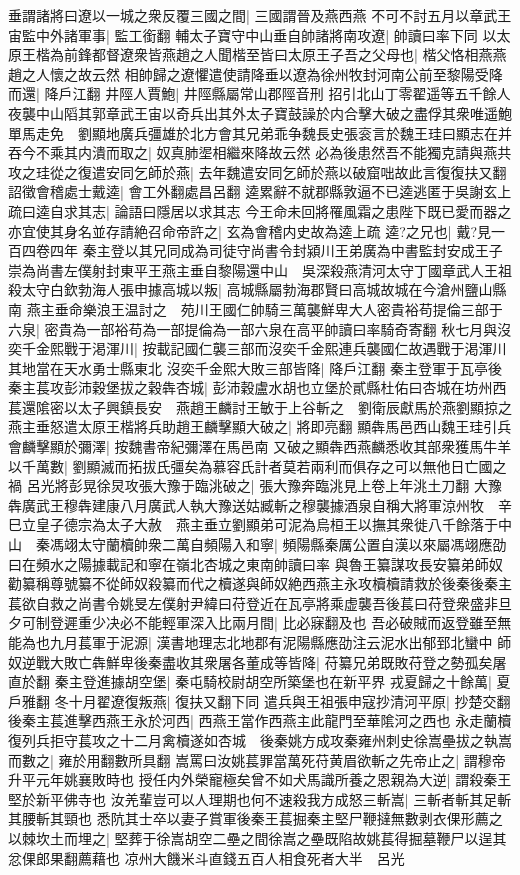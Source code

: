 垂謂諸將曰遼以一城之衆反覆三國之間|{
	三國謂晉及燕西燕}
不可不討五月以章武王宙監中外諸軍事|{
	監工銜翻}
輔太子寶守中山垂自帥諸將南攻遼|{
	帥讀曰率下同}
以太原王楷為前鋒都督遼衆皆燕趙之人聞楷至皆曰太原王子吾之父母也|{
	楷父恪相燕燕趙之人懷之故云然}
相帥歸之遼懼遣使請降垂以遼為徐州牧封河南公前至黎陽受降而還|{
	降戶江翻}
井陘人賈鮑|{
	井陘縣屬常山郡陘音刑}
招引北山丁零翟遥等五千餘人夜襲中山䧟其郭章武王宙以奇兵出其外太子寶鼓譟於内合擊大破之盡俘其衆唯遥鮑單馬走免　劉顯地廣兵彊雄於北方會其兄弟乖争魏長史張衮言於魏王珪曰顯志在并吞今不乘其内潰而取之|{
	奴真肺埿相繼來降故云然}
必為後患然吾不能獨克請與燕共攻之珪從之復遣安同乞師於燕|{
	去年魏遣安同乞師於燕以破窟咄故此言復復扶又翻}
詔徵會稽處士戴逵|{
	會工外翻處昌呂翻}
逵累辭不就郡縣敦逼不已逵逃匿于吳謝玄上疏曰逵自求其志|{
	論語曰隱居以求其志}
今王命未回將罹風霜之患陛下既已愛而器之亦宜使其身名並存請絶召命帝許之|{
	玄為會稽内史故為逵上疏}
逵?之兄也|{
	戴?見一百四卷四年}
秦主登以其兄同成為司徒守尚書令封潁川王弟廣為中書監封安成王子崇為尚書左僕射封東平王燕主垂自黎陽還中山　吳深殺燕清河太守丁國章武人王祖殺太守白欽勃海人張申據高城以叛|{
	高城縣屬勃海郡賢曰高城故城在今滄州鹽山縣南}
燕主垂命樂浪王温討之　苑川王國仁帥騎三萬襲鮮卑大人密貴裕苟提倫三部于六泉|{
	密貴為一部裕苟為一部提倫為一部六泉在高平帥讀曰率騎奇寄翻}
秋七月與沒奕千金熙戰于渇渾川|{
	按載記國仁襲三部而沒奕千金熙連兵襲國仁故遇戰于渇渾川其地當在天水勇士縣東北}
沒奕千金熙大敗三部皆降|{
	降戶江翻}
秦主登軍于瓦亭後秦主萇攻彭沛穀堡拔之穀犇杏城|{
	彭沛穀盧水胡也立堡於貳縣杜佑曰杏城在坊州西}
萇還隂密以太子興鎮長安　燕趙王麟討王敏于上谷斬之　劉衛辰獻馬於燕劉顯掠之燕主垂怒遣太原王楷將兵助趙王麟擊顯大破之|{
	將即亮翻}
顯犇馬邑西山魏王珪引兵會麟擊顯於彌澤|{
	按魏書帝紀彌澤在馬邑南}
又破之顯犇西燕麟悉收其部衆獲馬牛羊以千萬數|{
	劉顯滅而拓拔氏彊矣為慕容氏計者莫若兩利而俱存之可以無他日亡國之禍}
呂光將彭晃徐炅攻張大豫于臨洮破之|{
	張大豫奔臨洮見上卷上年洮土刀翻}
大豫犇廣武王穆犇建康八月廣武人執大豫送姑臧斬之穆襲據酒泉自稱大將軍涼州牧　辛巳立皇子德宗為太子大赦　燕主垂立劉顯弟可泥為烏桓王以撫其衆徙八千餘落于中山　秦馮翊太守蘭櫝帥衆二萬自頻陽入和寧|{
	頻陽縣秦厲公置自漢以來屬馮翊應劭曰在頻水之陽據載記和寧在嶺北杏城之東南帥讀曰率}
與魯王纂謀攻長安纂弟師奴勸纂稱尊號纂不從師奴殺纂而代之櫝遂與師奴絶西燕主永攻櫝櫝請救於後秦後秦主萇欲自救之尚書令姚旻左僕射尹緯曰苻登近在瓦亭將乘虚襲吾後萇曰苻登衆盛非旦夕可制登遲重少决必不能輕軍深入比兩月間|{
	比必寐翻及也}
吾必破賊而返登雖至無能為也九月萇軍于泥源|{
	漢書地理志北地郡有泥陽縣應劭注云泥水出郁郅北蠻中}
師奴逆戰大敗亡犇鮮卑後秦盡收其衆屠各董成等皆降|{
	苻纂兄弟既敗苻登之勢孤矣屠直於翻}
秦主登進據胡空堡|{
	秦屯騎校尉胡空所築堡也在新平界}
戎夏歸之十餘萬|{
	夏戶雅翻}
冬十月翟遼復叛燕|{
	復扶又翻下同}
遣兵與王祖張申寇抄清河平原|{
	抄楚交翻}
後秦主萇進擊西燕王永於河西|{
	西燕王當作西燕主此龍門至華隂河之西也}
永走蘭櫝復列兵拒守萇攻之十二月禽櫝遂如杏城　後秦姚方成攻秦雍州刺史徐嵩壘拔之執嵩而數之|{
	雍於用翻數所具翻}
嵩罵曰汝姚萇罪當萬死苻黄眉欲斬之先帝止之|{
	謂穆帝升平元年姚襄敗時也}
授任内外榮寵極矣曾不如犬馬識所養之恩親為大逆|{
	謂殺秦王堅於新平佛寺也}
汝羌輩豈可以人理期也何不速殺我方成怒三斬嵩|{
	三斬者斬其足斬其腰斬其頸也}
悉阬其士卒以妻子賞軍後秦王萇掘秦主堅尸鞭撻無數剥衣倮形薦之以棘坎土而埋之|{
	堅葬于徐嵩胡空二壘之間徐嵩之壘既陷故姚萇得掘墓鞭尸以逞其忿倮郎果翻薦藉也}
凉州大饑米斗直錢五百人相食死者大半　呂光

